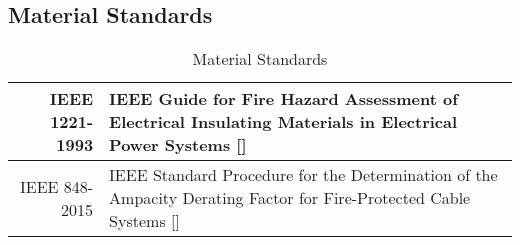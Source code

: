 \subsection{Material Standards}
\bgroup
\def\arraystretch{1.5}
\begin{table}[H]
\centering
\begin{tabular}{ | m{4cm} | m{12cm}| } 
\hline
\multicolumn{1}{|r|}{IEEE 1221-1993} & IEEE Guide for Fire Hazard Assessment of Electrical Insulating Materials in Electrical Power Systems []\\ 
\hline
\multicolumn{1}{|r|}{IEEE 848-2015} & IEEE Standard Procedure for the Determination of the Ampacity Derating Factor for Fire-Protected Cable Systems []\\ 
\hline
\end{tabular}
\caption{Material Standards}
\end{table}	


%